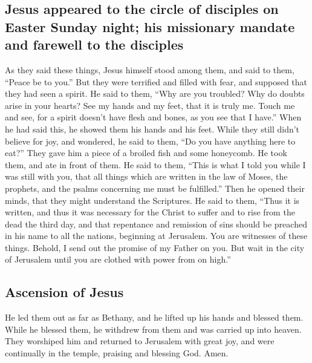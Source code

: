 \hypertarget{jesus-appeared-to-the-circle-of-disciples-on-easter-sunday-night-his-missionary-mandate-and-farewell-to-the-disciples}{%
\subsection{Jesus appeared to the circle of disciples on Easter Sunday
night; his missionary mandate and farewell to the
disciples}\label{jesus-appeared-to-the-circle-of-disciples-on-easter-sunday-night-his-missionary-mandate-and-farewell-to-the-disciples}}

 As they said these things, Jesus himself stood among
them, and said to them, ``Peace be to you.''  But they
were terrified and filled with fear, and supposed that they had seen a
spirit.  He said to them, ``Why are you troubled? Why do
doubts arise in your hearts?  See my hands and my feet,
that it is truly me. Touch me and see, for a spirit doesn't have flesh
and bones, as you see that I have.''  When he had said
this, he showed them his hands and his feet.  While they
still didn't believe for joy, and wondered, he said to them, ``Do you
have anything here to eat?''  They gave him a piece of a
broiled fish and some honeycomb.  He took them, and ate
in front of them.  He said to them, ``This is what I told
you while I was still with you, that all things which are written in the
law of Moses, the prophets, and the psalms concerning me must be
fulfilled.''  Then he opened their minds, that they might
understand the Scriptures.  He said to them, ``Thus it is
written, and thus it was necessary for the Christ to suffer and to rise
from the dead the third day,  and that repentance and
remission of sins should be preached in his name to all the nations,
beginning at Jerusalem.  You are witnesses of these
things.  Behold, I send out the promise of my Father on
you. But wait in the city of Jerusalem until you are clothed with power
from on high.''

\hypertarget{ascension-of-jesus}{%
\subsection{Ascension of Jesus}\label{ascension-of-jesus}}

 He led them out as far as Bethany, and he lifted up his
hands and blessed them.  While he blessed them, he
withdrew from them and was carried up into heaven.  They
worshiped him and returned to Jerusalem with great joy, 
and were continually in the temple, praising and blessing God. Amen.
